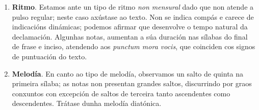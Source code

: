 \documentclass[a4paper, twoside]{templates/ociamthesis}
\begin{document}
\begin{enumerate}
\def\labelenumi{\arabic{enumi}.}
\item
  \textbf{Ritmo}. Estamos ante un tipo de ritmo \emph{non mensural} dado que non atende a pulso regular; neste caso axústase ao texto. Non se indica compás e carece de indicacións dinámicas; podemos afirmar que desenvolve o tempo natural da declamación. Algunhas notas, aumentan a súa duración nas sílabas do final de frase e inciso, atendendo aos \emph{punctum mora vocis}, que coinciden cos signos de puntuación do texto.
\item
  \textbf{Melodía}. En canto ao tipo de melodía, observamos un salto de quinta na primeira sílaba; as notas non presentan grandes saltos, discurrindo por graos conxuntos con excepción de saltos de terceira tanto ascendentes como descendentes. Trátase dunha melodía diatónica.


\end{enumerate}
\end{document}
